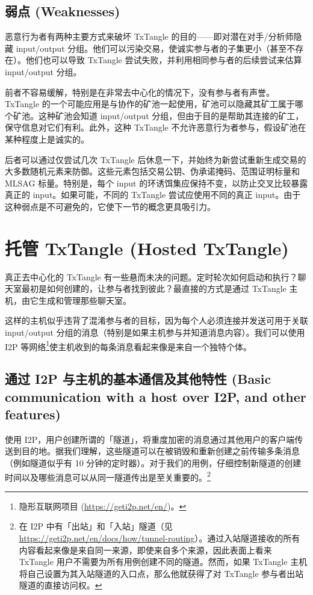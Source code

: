 \subsection{弱点 (Weaknesses)}
\label{subsec:weaknesses-txtangle}

恶意行为者有两种主要方式来破坏 TxTangle 的目的——即对潜在对手/分析师隐藏 input/output 分组。他们可以污染交易，使诚实参与者的子集更小（甚至不存在）\cite{coinjoin-pollution}。他们也可以导致 TxTangle 尝试失败，并利用相同参与者的后续尝试来估算 input/output 分组。

前者不容易缓解，特别是在非常去中心化的情况下，没有参与者有声誉。TxTangle 的一个可能应用是与协作的矿池一起使用，矿池可以隐藏其矿工属于哪个矿池。这种矿池会知道 input/output 分组，但由于目的是帮助其连接的矿工，保守信息对它们有利。此外，这种 TxTangle 不允许恶意行为者参与，假设矿池在某种程度上是诚实的。

后者可以通过仅尝试几次 TxTangle 后休息一下，并始终为新尝试重新生成交易的大多数随机元素来防御。这些元素包括交易公钥、伪承诺掩码、范围证明标量和 MLSAG 标量。特别是，每个 input 的环诱饵集应保持不变，以防止交叉比较暴露真正的 input。如果可能，不同的 TxTangle 尝试应使用不同的真正 input。由于这种弱点是不可避免的，它使下一节的概念更具吸引力。



\section{托管 TxTangle (Hosted TxTangle)}
\label{sec:hosted-txtangle}

真正去中心化的 TxTangle 有一些悬而未决的问题。定时轮次如何启动和执行？聊天室最初是如何创建的，让参与者找到彼此？最直接的方式是通过 TxTangle 主机，由它生成和管理那些聊天室。

这样的主机似乎违背了混淆参与者的目标，因为每个人必须连接并发送可用于关联 input/output 分组的消息（特别是如果主机参与并知道消息内容）。我们可以使用 I2P 等网络\footnote{隐形互联网项目 (\url{https://geti2p.net/en/})。}使主机收到的每条消息看起来像是来自一个独特个体。


\subsection{通过 I2P 与主机的基本通信及其他特性 (Basic communication with a host over I2P, and other features)}
\label{subsec:txtangle-host-communication}

使用 I2P，用户创建所谓的「隧道」，将重度加密的消息通过其他用户的客户端传送到目的地。据我们理解，这些隧道可以在被销毁和重新创建之前传输多条消息（例如隧道似乎有 10 分钟的定时器）。对于我们的用例，仔细控制新隧道的创建时间以及哪些消息可以从同一隧道传出是至关重要的。\footnote{在 I2P 中有「出站」和「入站」隧道（见 \url{https://geti2p.net/en/docs/how/tunnel-routing}）。通过入站隧道接收的所有内容看起来像是来自同一来源，即使来自多个来源，因此表面上看来 TxTangle 用户不需要为所有用例创建不同的隧道。然而，如果 TxTangle 主机将自己设置为其入站隧道的入口点，那么他就获得了对 TxTangle 参与者出站隧道的直接访问权。}

